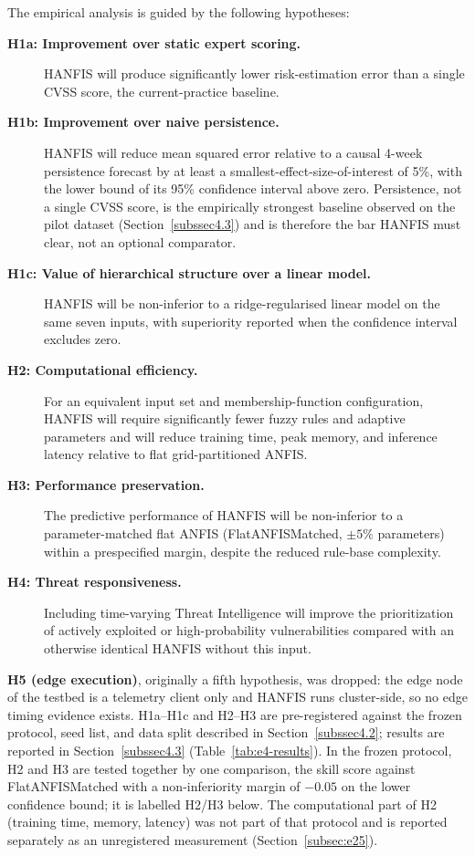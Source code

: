 \documentclass[referee,lineno,pdflatex,sn-basic]{sn-jnl}%
\theoremstyle{thmstyleone}%
\theoremstyle{thmstyletwo}%
\theoremstyle{thmstylethree}%
\begin{document}
The empirical analysis is guided by the following hypotheses:
\begin{description}
    \item[\textbf{H1a: Improvement over static expert scoring.}] HANFIS will produce significantly lower risk-estimation error than a single CVSS score, the current-practice baseline.
    \item[\textbf{H1b: Improvement over naive persistence.}] HANFIS will reduce mean squared error relative to a causal 4-week persistence forecast by at least a smallest-effect-size-of-interest of 5\%, with the lower bound of its 95\% confidence interval above zero. Persistence, not a single CVSS score, is the empirically strongest baseline observed on the pilot dataset (Section~\ref{subssec4.3}) and is therefore the bar HANFIS must clear, not an optional comparator.
    \item[\textbf{H1c: Value of hierarchical structure over a linear model.}] HANFIS will be non-inferior to a ridge-regularised linear model on the same seven inputs, with superiority reported when the confidence interval excludes zero.
    \item[\textbf{H2: Computational efficiency.}] For an equivalent input set and membership-function configuration, HANFIS will require significantly fewer fuzzy rules and adaptive parameters and will reduce training time, peak memory, and inference latency relative to flat grid-partitioned ANFIS.
    \item[\textbf{H3: Performance preservation.}] The predictive performance of HANFIS will be non-inferior to a parameter-matched flat ANFIS (FlatANFISMatched, $\pm 5\%$ parameters) within a prespecified margin, despite the reduced rule-base complexity.
    \item[\textbf{H4: Threat responsiveness.}] Including time-varying Threat Intelligence will improve the prioritization of actively exploited or high-probability vulnerabilities compared with an otherwise identical HANFIS without this input.
\end{description}
\textbf{H5 (edge execution)}, originally a fifth hypothesis, was dropped: the edge node of the testbed is a telemetry client only and HANFIS runs cluster-side, so no edge timing evidence exists.
H1a--H1c and H2--H3 are pre-registered against the frozen protocol, seed list, and data split described in Section~\ref{subssec4.2}; results are reported in Section~\ref{subssec4.3} (Table~\ref{tab:e4-results}). In the frozen protocol, H2 and H3 are tested together by one comparison, the skill score against FlatANFISMatched with a non-inferiority margin of $-0.05$ on the lower confidence bound; it is labelled H2/H3 below. The computational part of H2 (training time, memory, latency) was not part of that protocol and is reported separately as an unregistered measurement (Section~\ref{subsec:e25}).
\end{document}
